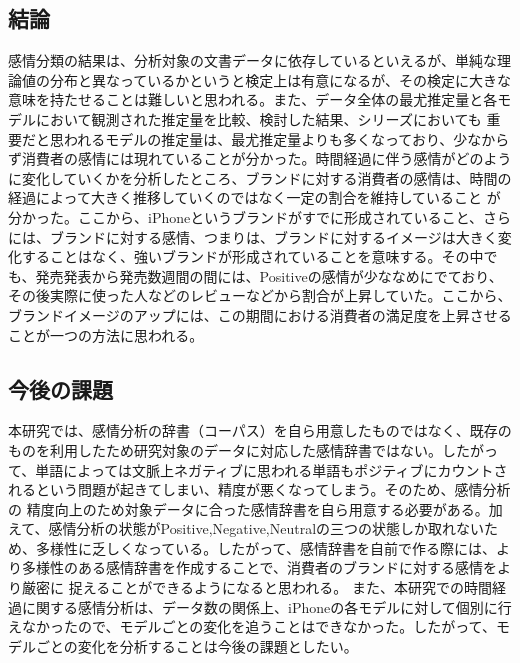 \documentclass[uplatex,11pt]{jsarticle}
\begin{document}
\subsection{結論}
感情分類の結果は、分析対象の文書データに依存しているといえるが、単純な理論値の分布と異なっているかというと検定上は有意になるが、その検定に大きな意味を持たせることは難しいと思われる。また、データ全体の最尤推定量と各モデルにおいて観測された推定量を比較、検討した結果、シリーズにおいても
重要だと思われるモデルの推定量は、最尤推定量よりも多くなっており、少なからず消費者の感情には現れていることが分かった。時間経過に伴う感情がどのように変化していくかを分析したところ、ブランドに対する消費者の感情は、時間の経過によって大きく推移していくのではなく一定の割合を維持していること
が分かった。ここから、iPhoneというブランドがすでに形成されていること、さらには、ブランドに対する感情、つまりは、ブランドに対するイメージは大きく変化することはなく、強いブランドが形成されていることを意味する。その中でも、発売発表から発売数週間の間には、Positiveの感情が少ななめにでており、
その後実際に使った人などのレビューなどから割合が上昇していた。ここから、ブランドイメージのアップには、この期間における消費者の満足度を上昇させることが一つの方法に思われる。
\subsection{今後の課題}
本研究では、感情分析の辞書（コーパス）を自ら用意したものではなく、既存のものを利用したため研究対象のデータに対応した感情辞書ではない。したがって、単語によっては文脈上ネガティブに思われる単語もポジティブにカウントされるという問題が起きてしまい、精度が悪くなってしまう。そのため、感情分析の
精度向上のため対象データに合った感情辞書を自ら用意する必要がある。加えて、感情分析の状態がPositive,Negative,Neutralの三つの状態しか取れないため、多様性に乏しくなっている。したがって、感情辞書を自前で作る際には、より多様性のある感情辞書を作成することで、消費者のブランドに対する感情をより厳密に
捉えることができるようになると思われる。
また、本研究での時間経過に関する感情分析は、データ数の関係上、iPhoneの各モデルに対して個別に行えなかったので、モデルごとの変化を追うことはできなかった。したがって、モデルごとの変化を分析することは今後の課題としたい。
\end{document}

